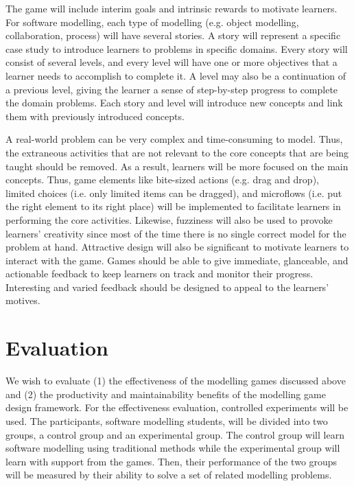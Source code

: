 \documentclass[runningheads,a4paper]{llncs}
\begin{document}
The game will include interim goals and intrinsic rewards to motivate learners. For software modelling, each type of modelling (e.g. object modelling, collaboration, process) will have several stories. A story will represent a specific case study to introduce learners to problems in specific domains. Every story will consist of several levels, and every level will have one or more objectives that a learner needs to accomplish to complete it. A level may also be a continuation of a previous level, giving the learner a sense of step-by-step progress to complete the domain problems. Each story and level will introduce new concepts and link them with previously introduced concepts.

A real-world problem can be very complex and time-consuming to model. Thus, the extraneous activities that are not relevant to the core concepts that are being taught should be removed. As a result, learners will be more focused on the main concepts. Thus, game elements like bite-sized actions (e.g. drag and drop), limited choices (i.e. only limited items can be dragged), and microflows (i.e. put the right element to its right place) will be implemented to facilitate learners in performing the core activities. Likewise, fuzziness will also be used to provoke learners' creativity since most of the time there is no single correct model for the problem at hand. Attractive design will also be significant to motivate learners to interact with the game. Games should be able to give immediate, glanceable, and actionable feedback to keep learners on track and monitor their progress. Interesting and varied feedback should be designed to appeal to the learners' motives. 

\section{Evaluation}
We wish to evaluate (1) the effectiveness of the modelling games discussed above and (2) the productivity and maintainability benefits of the modelling game design framework. For the effectiveness evaluation, controlled experiments will be used. The participants, software modelling students, will be divided into two groups, a control group and an experimental group. The control group will learn software modelling using traditional methods while the experimental group will learn with support from the games. Then, their performance of the two groups will be measured by their ability to solve a set of related modelling problems. 
\end{document}
